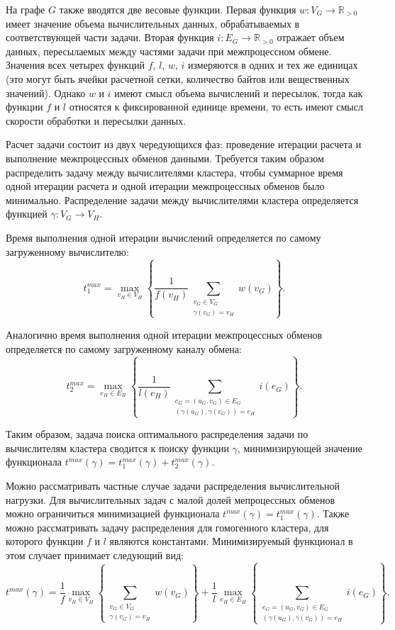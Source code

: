 На графе $G$ также вводятся две весовые функции.
Первая функция $w: V_G \rightarrow \mathbb{R}_{> 0}$ имеет значение объема вычислительных данных, обрабатываемых в соответствующей части задачи.
Вторая функция $i: E_G \rightarrow \mathbb{R}_{> 0}$ отражает объем данных, пересылаемых между частями задачи при межпроцессном обмене.
Значения всех четырех функций $f$, $l$, $w$, $i$ измеряются в одних и тех же единицах (это могут быть ячейки расчетной сетки, количество байтов или вещественных значений).
Однако $w$ и $i$ имеют смысл объема вычислений и пересылок, тогда как функции $f$ и $l$ относятся к фиксированной единице времени, то есть имеют смысл скорости обработки и пересылки данных.

Расчет задачи состоит из двух чередующихся фаз: проведение итерации расчета и выполнение межпроцессных обменов данными.
Требуется таким образом распределить задачу между вычислителями кластера, чтобы суммарное время одной итерации расчета и одной итерации межпроцессных обменов было минимально.
Распределение задачи между вычислителями кластера определяется функцией $\gamma: V_G \rightarrow V_H$.

Время выполнения одной итерации вычислений определяется по самому загруженному вычислителю:
\begin{equation}
	t_1^{max} = \max_{v_H \in V_H}{ \left\{ \frac{1}{f(v_H)} \sum_{\substack{v_G \in V_G \\ \gamma(v_G) = v_H}}{w(v_G)} \right\} }.
\end{equation}

Аналогично время выполнения одной итерации межпроцессных обменов определяется по самому загруженному каналу обмена:
\begin{equation}
	t_2^{max} = \max_{e_H \in E_H}{ \left\{ \frac{1}{l(e_H)} \sum_{\substack{e_G = (u_G, v_G) \in E_G \\ (\gamma(u_G), \gamma(v_G)) = e_H}}{i(e_G)} \right\} }.
\end{equation}

Таким образом, задача поиска оптимального распределения задачи по вычислителям кластера сводится к поиску функции $\gamma$, минимизирующей значение функционала $t^{max}(\gamma) = t_1^{max}(\gamma) + t_2^{max}(\gamma)$.

Можно рассматривать частные случае задачи распределения вычислительной нагрузки.
Для вычислительных задач с малой долей мепроцессных обменов можно ограничиться минимизацией функционала $t^{max}(\gamma) = t_1^{max}(\gamma)$.
Также можно рассматривать задачу распределения для гомогенного кластера, для которого функции $f$ и $l$ являются константами.
Минимизируемый функционал в этом случает принимает следующий вид:
\begin{equation}
	t^{max}(\gamma) =
		\frac{1}{f} \max_{v_H \in V_H}{ \left\{ \sum_{\substack{v_G \in V_G \\ \gamma(v_G) = v_H}}{w(v_G)} \right\} } + 
		\frac{1}{l} \max_{e_H \in E_H}{ \left\{ \sum_{\substack{e_G = (u_G, v_G) \in E_G \\ (\gamma(u_G), \gamma(v_G)) = e_H}}{i(e_G)} \right\} }.
\end{equation}

